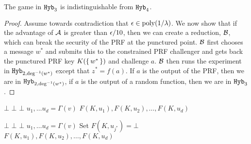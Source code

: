 \begin{lemma}
	\label{lemma:hybC}
	The game in $\texttt{Hyb}_{3}$ is indistinguishable from $\texttt{Hyb}_4$.
	\begin{proof}
		Assume towards contradiction that $\epsilon \in \operatorname{poly}(1/\lambda)$.
		We now show that if the advantage of $\mathcal{A}$ is greater than $\epsilon/10$, then we can
		create a reduction, $\mathcal{B}$, which can break the security of the PRF at the punctured point.
		$\mathcal{B}$ first chooses a message $w^*$ and submits this to the constrained PRF challenger and gets back the punctured PRF key
		$K(\set{w^*})$ and challenge $a$. $\mathcal{B}$ then runs the experiment in $\texttt{Hyb}_{2, \deg^{-1}(w^*)}$
		except that $z^* = f(a)$. If $a$ is the output of the PRF, then we are in $\texttt{Hyb}_{2, \deg^{-1}(w^*)}$,
		if $a$ is the output of a random function, then we are in $\texttt{Hyb}_3$.
	\end{proof}
\end{lemma}

\begin{algorithm}[H]
	\caption{
		Circuit for the neighbor function, $\circNeigb$ with PRF key
		$K$ and constant $w^*, z^*$%
	}
	\begin{algorithmic}[1]
				\State \Return $\bot$
			\EndIf
				\State \Return $\bot$ 
			\EndIf
				\State \Return $\bot$
			\EndIf
			\State $u_1, \dots u_d = \Gamma(v)$
			\State \Return $F(K, u_1), F(K, u_2), \dots, F(K, u_d)$
		\EndFunction
	\end{algorithmic}
	\label{alg:neighbHyb1}
\end{algorithm}


\begin{algorithm}[H]
	\caption{
		Circuit for the neighbor function, $\circNeigb$ with punctured PRF key
		$K(S)$ and constant $w^*, Y^*, J^*, z^*$%
	}
	\begin{algorithmic}[1]
				\State \Return $\bot$
			\EndIf
				\State \Return $\bot$ 
			\EndIf
				\State \Return $\bot$
			\EndIf
			\State $u_1, \dots u_d = \Gamma(v)$
			 	\State Set $F(K, u_{j^*}) = \bot$
			\EndIf
			\State \Return $F(K, u_1), F(K, u_2), \dots, F(K, u_d)$
		\EndFunction
	\end{algorithmic}
	\label{alg:neighbHyb2}
\end{algorithm}